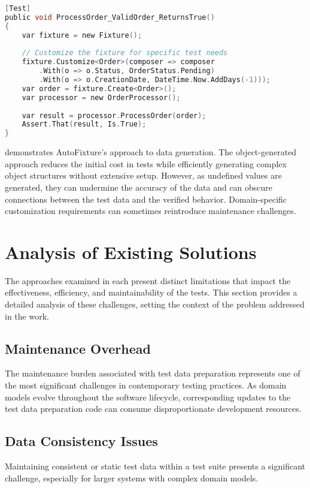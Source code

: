 \begin{lstlisting}[language=C, caption=Object Generation Libraries,label={lst:gen}]
[Test]
public void ProcessOrder_ValidOrder_ReturnsTrue()
{
    var fixture = new Fixture();
    
    // Customize the fixture for specific test needs
    fixture.Customize<Order>(composer => composer
        .With(o => o.Status, OrderStatus.Pending)
        .With(o => o.CreationDate, DateTime.Now.AddDays(-1)));
    var order = fixture.Create<Order>();
    var processor = new OrderProcessor();
    
    var result = processor.ProcessOrder(order);
    Assert.That(result, Is.True);
}
\end{lstlisting}
 demonstrates AutoFixture's approach to data generation. The object-generated approach reduces the initial cost in tests while efficiently generating complex object structures without extensive setup. However, as undefined values are generated, they can undermine the accuracy of the data and can obscure connections between the test data and the verified behavior. Domain-specific customization requirements can sometimes reintroduce maintenance challenges.
\section{Analysis of Existing Solutions}
The approaches examined in  each present distinct limitations that impact the effectiveness, efficiency, and maintainability of the tests. This section provides a detailed analysis of these challenges, setting the context of the problem addressed in the work.
\subsection{Maintenance Overhead}
The maintenance burden associated with test data preparation represents one of the most significant challenges in contemporary testing practices. As domain models evolve throughout the software lifecycle, corresponding updates to the test data preparation code can consume disproportionate development resources.
\subsection{Data Consistency Issues}
Maintaining consistent or static test data within a test suite presents a significant challenge, especially for larger systems with complex domain models.
